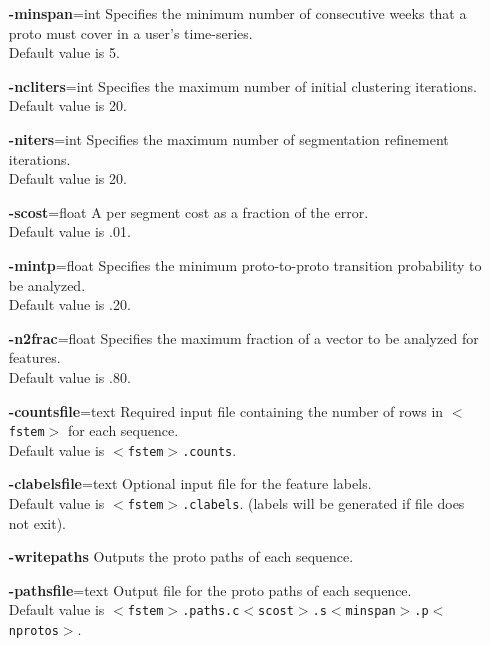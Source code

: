 \documentclass[]{article}
\begin{document}
\begin{description}[align=left,style=nextline,leftmargin=*,font=\normalfont]
\begin{itemize}[leftmargin=+.8in]
    \item[\textbf{-minspan}=int]
       Specifies the minimum number of consecutive weeks that a proto must
       cover in a user's time-series.\\
       Default value is 5.

    \item[\textbf{-ncliters}=int]
       Specifies the maximum number of initial clustering iterations.\\
       Default value is 20.

    \item[\textbf{-niters}=int]
       Specifies the maximum number of segmentation refinement iterations.\\
       Default value is 20.

    \item[\textbf{-scost}=float]
       A per segment cost as a fraction of the error.\\
       Default value is .01.

    \item[\textbf{-mintp}=float]
       Specifies the minimum proto-to-proto transition probability to be
       analyzed.\\
       Default value is .20.

    \item[\textbf{-n2frac}=float]
       Specifies the maximum fraction of a vector to be analyzed for features.\\
       Default value is .80.

    \item[\textbf{-countsfile}=text]
       Required input file containing the number of rows in {\tt$<$fstem$>$} for
       each sequence.\\
       Default value is {\tt$<$fstem$>$.counts}.

    \item[\textbf{-clabelsfile}=text]
       Optional input file for the feature labels.\\
       Default value is {\tt$<$fstem$>$.clabels}. (labels will be generated if
       file does not exit).

    \item[\bf-writepaths]
       Outputs the proto paths of each sequence.

    \item[\textbf{-pathsfile}=text]
       Output file for the proto paths of each sequence.\\
       Default value is
       {\tt$<$fstem$>$.paths.c$<$scost$>$.s$<$minspan$>$.p$<$nprotos$>$}.


\end{itemize}
\end{description}
\end{document}

